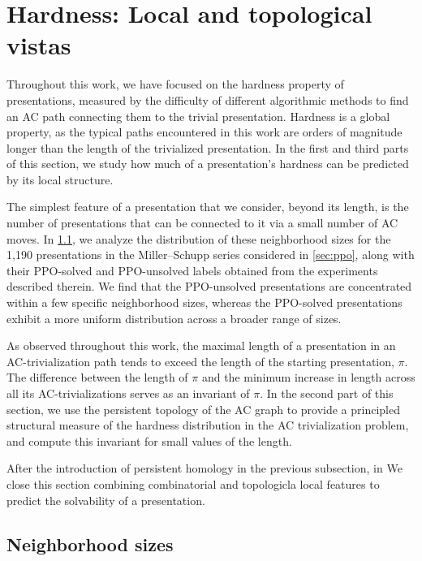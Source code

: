 
\section{Hardness: Local and topological vistas}\label{sec:isolated}

Throughout this work, we have focused on the hardness property of presentations, measured by the difficulty of different algorithmic methods to find an AC path connecting them to the trivial presentation.  
Hardness is a global property, as the typical paths encountered in this work are orders of magnitude longer than the length of the trivialized presentation.  
In the first and third parts of this section, we study how much of a presentation's hardness can be predicted by its local structure.  

The simplest feature of a presentation that we consider, beyond its length, is the number of presentations that can be connected to it via a small number of AC moves.  
In \cref{ss:nbhd_sizes}, we analyze the distribution of these neighborhood sizes for the 1,190 presentations in the Miller--Schupp series considered in \cref{sec:ppo}, along with their PPO-solved and PPO-unsolved labels obtained from the experiments described therein.  
We find that the PPO-unsolved presentations are concentrated within a few specific neighborhood sizes, whereas the PPO-solved presentations exhibit a more uniform distribution across a broader range of sizes.  

As observed throughout this work, the maximal length of a presentation in an AC-trivialization path tends to exceed the length of the starting presentation, \(\pi\).  
The difference between the length of \(\pi\) and the minimum increase in length across all its AC-trivializations serves as an invariant of \(\pi\).  
In the second part of this section, we use the persistent topology of the AC graph to provide a principled structural measure of the hardness distribution in the AC trivialization problem, and compute this invariant for small values of the length.

After the introduction of persistent homology in the previous subsection, in 
We close this section combining combinatorial and topologicla local features to predict the solvability of a presentation.


\subsection{Neighborhood sizes}\label{ss:nbhd_sizes}

